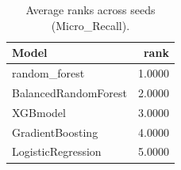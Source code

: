 \begin{table}[t]
\centering
\begin{tabular}{lr}
\toprule
Model & rank \\
\midrule
random_forest & 1.0000 \\
BalancedRandomForest & 2.0000 \\
XGBmodel & 3.0000 \\
GradientBoosting & 4.0000 \\
LogisticRegression & 5.0000 \\
\bottomrule
\end{tabular}
\caption{Average ranks across seeds (Micro_Recall).}
\label{tab:avg_rank_Micro_Recall}
\end{table}